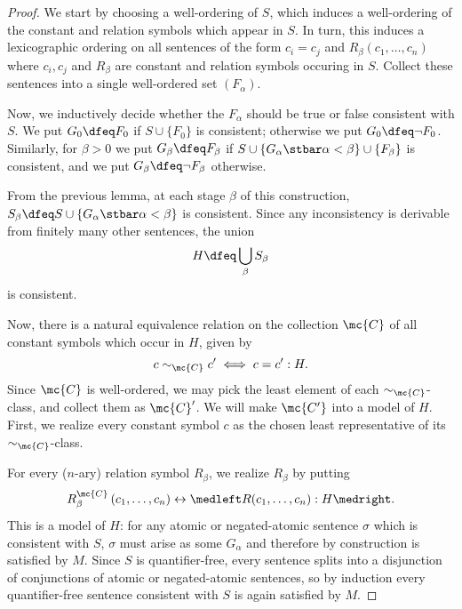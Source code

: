 \documentclass[11pt]{article}
\begin{document}

\begin{proof}
  We start by choosing a well-ordering of $S$, which induces a well-ordering of the constant and relation symbols which appear in $S$. In turn, this induces a lexicographic ordering on all sentences of the form $c_i = c_j$ and $R_{\beta}(c_1, \dots, c_n)$ where $c_i, c_j$ and $R_{\beta}$ are constant and relation symbols occuring in $S$. Collect these sentences into a single well-ordered set $(F_{\alpha})$.

  Now, we inductively decide whether the $F_{\alpha}$ should be true or false consistent with $S$. We put $G_{0} \dfeq F_0$ if $S \cup \{F_0\}$ is consistent; otherwise we put $G_0 \dfeq \neg F_0$. Similarly, for $\beta > 0$ we put $G_{\beta} \dfeq F_{\beta}$ if $S \cup \{G_{\alpha} \stbar \alpha < \beta\} \cup \{F_{\beta}\}$ is consistent, and we put $G_{\beta} \dfeq \neg F_{\beta}$ otherwise.

  From the previous lemma, at each stage $\beta$ of this construction, $S_{\beta} \dfeq S \cup \{G_{\alpha} \stbar \alpha < \beta\}$ is consistent. Since any inconsistency is derivable from finitely many other sentences, the union
  $$
H \dfeq \bigcup_{\beta} S_{\beta} 
$$
is consistent.

Now, there is a natural equivalence relation on the collection $\mc{C}$ of all constant symbols which occur in $H$, given by $$ c \sim_{\mc{C}} c' \iff c = c' : H .$$ Since $\mc{C}$ is well-ordered, we may pick the least element of each $\sim_{\mc{C}}$-class, and collect them as $\mc{C}'$. We will make $\mc{C'}$ into a model of $H$. First, we realize every constant symbol $c$ as the chosen least representative of its $\sim_{\mc{C}}$-class.

For every ($n$-ary) relation symbol $R_{\beta}$, we realize $R_{\beta}$ by putting
$$
R_{\beta}^{\mc{C}} \left(c_1, \dots, c_n\right) \leftrightarrow \medleft R(c_1, \dots, c_n) : H \medright.
$$
This is a model of $H$: for any atomic or negated-atomic sentence $\sigma$ which is consistent with $S$, $\sigma$ must arise as some $G_{\alpha}$ and therefore by construction is satisfied by $M$. Since $S$ is quantifier-free, every sentence splits into a disjunction of conjunctions of atomic or negated-atomic sentences, so by induction every quantifier-free sentence consistent with $S$ is again satisfied by $M$.
\end{proof}
\end{document}
